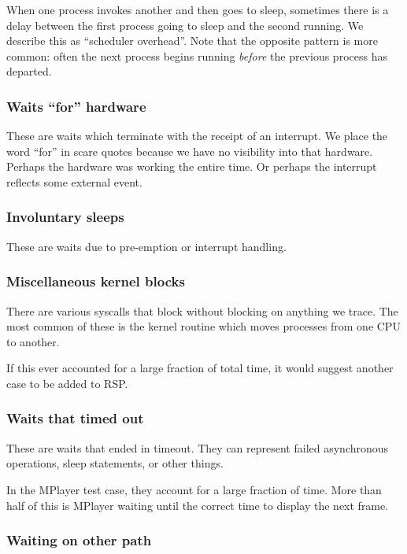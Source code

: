 \documentclass[10pt]{article}
\begin{document}
When one process invokes another and then goes to sleep, sometimes there is a delay between the first process going to sleep and the second running.  We describe this as ``scheduler overhead''.  Note that the opposite pattern is more common: often the next process begins running \emph{before} the previous process has departed.

\subsubsection{Waits ``for'' hardware}

These are waits which terminate with the receipt of an interrupt.  We place the word ``for'' in scare quotes because we have no visibility into that hardware.  Perhaps the hardware was working the entire time.  Or perhaps the interrupt reflects some external event.

\subsubsection{Involuntary sleeps}

These are waits due to pre-emption or interrupt handling.

\subsubsection{Miscellaneous kernel blocks}

There are various syscalls that block without blocking on anything we trace.  The most common of these is the kernel routine which moves processes from one CPU to another.

If this ever accounted for a large fraction of total time, it would suggest another case to be added to RSP.

\subsubsection{Waits that timed out}

These are waits that ended in timeout.  They can represent failed asynchronous operations, sleep statements, or other things.

In the MPlayer test case, they account for a large fraction of time.  More than half of this is MPlayer waiting until the correct time to display the next frame.

\subsubsection{Waiting on other path}
\end{document}
